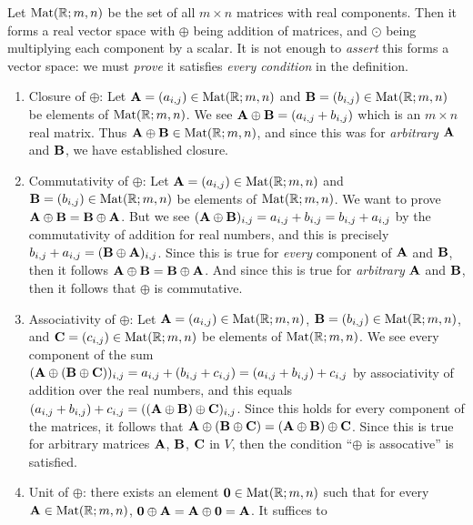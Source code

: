 \begin{example}
Let $\mathrm{Mat}(\mathbb{R};m,n)$ be the set of all $m\times n$ matrices with real components.
Then it forms a real vector space with $\oplus$ being addition of
matrices, and $\odot$ being multiplying each component by a scalar.
It is not enough to \emph{assert} this forms a vector space: we must
\emph{prove} it satisfies \emph{every condition} in the definition.
\begin{enumerate}[label=(\arabic*)]
\item Closure of $\oplus$: Let $\mathbf{A}=(a_{i,j})\in\mathrm{Mat}(\mathbb{R};m,n)$ and
  $\mathbf{B}=(b_{i,j})\in\mathrm{Mat}(\mathbb{R};m,n)$ be elements of $\mathrm{Mat}(\mathbb{R};m,n)$.
  We see $\mathbf{A}\oplus\mathbf{B}=(a_{i,j}+b_{i,j})$ which is an $m\times n$
  real matrix. Thus $\mathbf{A}\oplus\mathbf{B}\in\mathrm{Mat}(\mathbb{R};m,n)$, and since
  this was for \emph{arbitrary} $\mathbf{A}$ and $\mathbf{B}$, we have
  established closure.
\item Commutativity of $\oplus$: Let $\mathbf{A}=(a_{i,j})\in\mathrm{Mat}(\mathbb{R};m,n)$ and
  $\mathbf{B}=(b_{i,j})\in\mathrm{Mat}(\mathbb{R};m,n)$ be elements of $\mathrm{Mat}(\mathbb{R};m,n)$.
  We want to prove $\mathbf{A}\oplus\mathbf{B}=\mathbf{B}\oplus\mathbf{A}$.
  But we see $(\mathbf{A}\oplus\mathbf{B})_{i,j} = a_{i,j}+b_{i,j} = b_{i,j}+a_{i,j}$
  by the commutativity of addition for real numbers, and this is
  precisely
  $b_{i,j}+a_{i,j} = (\mathbf{B}\oplus\mathbf{A})_{i,j}$. Since this is true
  for \emph{every} component of $\mathbf{A}$ and $\mathbf{B}$, then it follows
  $\mathbf{A}\oplus\mathbf{B}=\mathbf{B}\oplus\mathbf{A}$.
  And since this is true for \emph{arbitrary} $\mathbf{A}$ and
  $\mathbf{B}$, then it follows that $\oplus$ is commutative.
\item Associativity of $\oplus$:
Let $\mathbf{A}=(a_{i,j})\in\mathrm{Mat}(\mathbb{R};m,n)$,
  $\mathbf{B}=(b_{i,j})\in\mathrm{Mat}(\mathbb{R};m,n)$, and
  $\mathbf{C}=(c_{i,j})\in\mathrm{Mat}(\mathbb{R};m,n)$ be elements of $\mathrm{Mat}(\mathbb{R};m,n)$.
  We see every component of the sum $(\mathbf{A}\oplus(\mathbf{B}\oplus\mathbf{C}))_{i,j} = a_{i,j} + (b_{i,j}+c_{i,j}) = (a_{i,j} + b_{i,j})+c_{i,j}$
  by associativity of addition over the real numbers,
  and this equals $(a_{i,j} + b_{i,j})+c_{i,j} = ((\mathbf{A}\oplus\mathbf{B})\oplus\mathbf{C})_{i,j}$.
  Since this holds for every component of the matrices, it follows that
  $\mathbf{A}\oplus(\mathbf{B}\oplus\mathbf{C}) = (\mathbf{A}\oplus\mathbf{B})\oplus\mathbf{C}$.
  Since this is true for arbitrary matrices $\mathbf{A}$, $\mathbf{B}$,
  $\mathbf{C}$ in $V$, then the condition ``$\oplus$ is assocative'' is satisfied.
\item Unit of $\oplus$: there exists an element $\mathbf{0}\in\mathrm{Mat}(\mathbb{R};m,n)$ such that
  for every $\mathbf{A}\in\mathrm{Mat}(\mathbb{R};m,n)$,
  $\mathbf{0}\oplus\mathbf{A}=\mathbf{A}\oplus\mathbf{0}=\mathbf{A}$. It suffices to

\end{enumerate}
\end{example}
